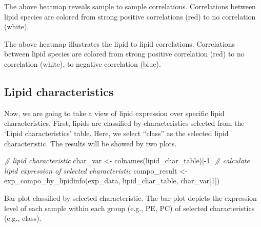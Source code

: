 \documentclass[]{article}
\newcommand{\hlnum}[1]{\textcolor[rgb]{0.816,0.125,0.439}{#1}}%
\newcommand{\hlstr}[1]{\textcolor[rgb]{0.251,0.627,0.251}{#1}}%
\newcommand{\hlcom}[1]{\textcolor[rgb]{0.502,0.502,0.502}{\textit{#1}}}%
\newcommand{\hlopt}[1]{\textcolor[rgb]{0,0,0}{#1}}%
\newcommand{\hlstd}[1]{\textcolor[rgb]{0.251,0.251,0.251}{#1}}%
\newcommand{\hlkwd}[1]{\textcolor[rgb]{0.878,0.439,0.125}{#1}}%
\newenvironment{Shaded}{\begin{myshaded}}{\end{myshaded}}
\newcommand{\KeywordTok}[1]{\hlkwd{#1}}
\newcommand{\DecValTok}[1]{\hlnum{#1}}
\newcommand{\StringTok}[1]{\hlstr{#1}}
\newcommand{\CommentTok}[1]{\hlcom{#1}}
\newcommand{\OperatorTok}[1]{\hlopt{#1}}
\newcommand{\NormalTok}[1]{\hlstd{#1}}
\begin{document}
The above heatmap reveals sample to sample correlations. Correlations between lipid species are colored from strong positive correlations (red) to no correlation (white).

\begin{Shaded}
\end{Shaded}

The above heatmap illustrates the lipid to lipid correlations. Correlations between lipid species are colored from strong positive correlation (red) to no correlation (white), to negative correlation (blue).

\hypertarget{subsec:pro_char}{%
\subsection{Lipid characteristics}\label{subsec:pro_char}}

Now, we are going to take a view of lipid expression over specific lipid characteristics. First, lipids are classified by characteristics selected from the `Lipid characteristics' table. Here, we select ``class'' as the selected lipid characteristic. The results will be showed by two plots.

\begin{Shaded}
\begin{Highlighting}[]
\CommentTok{# lipid characteristic}
\NormalTok{char_var <-}\StringTok{ }\KeywordTok{colnames}\NormalTok{(lipid_char_table)[}\OperatorTok{-}\DecValTok{1}\NormalTok{]}
\CommentTok{# calculate lipid expression of selected characteristic}
\NormalTok{compo_result <-}\StringTok{ }\KeywordTok{exp_compo_by_lipidinfo}\NormalTok{(exp_data, lipid_char_table, char_var[}\DecValTok{1}\NormalTok{])}
\end{Highlighting}
\end{Shaded}

\begin{Shaded}
\end{Shaded}

\label{fig:unnamed-chunk-15}Bar plot classified by selected characteristic. The bar plot depicts the expression level of each sample within each group (e.g., PE, PC) of selected characteristics (e.g., class).
\end{document}
